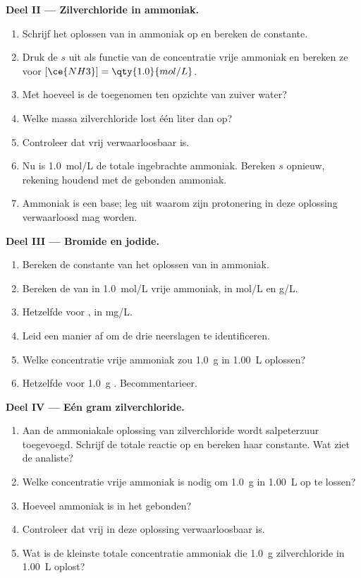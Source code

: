 \begin{problem}
\medskip
\noindent\textbf{Deel II --- Zilverchloride in ammoniak.}
\begin{enumerate}[resume]
  \item Schrijf het oplossen van  in ammoniak op en bereken de
        constante.
  \item Druk de  $s$ uit als functie van de concentratie vrije
        ammoniak en bereken ze voor $[\ce{NH3}] = \qty{1.0}{mol/L}$.
  \item Met hoeveel is de  toegenomen ten opzichte van zuiver
        water?
  \item Welke massa zilverchloride lost één liter dan op?
  \item Controleer dat vrij  verwaarloosbaar is.
  \item Nu is \qty{1.0}{mol/L} de totale ingebrachte ammoniak. Bereken
        $s$ opnieuw, rekening houdend met de gebonden ammoniak.
  \item Ammoniak is een base; leg uit waarom zijn protonering in deze
        oplossing verwaarloosd mag worden.
\end{enumerate}

\medskip
\noindent\textbf{Deel III --- Bromide en jodide.}
\begin{enumerate}[resume]
  \item Bereken de constante van het oplossen van  in ammoniak.
  \item Bereken de  van  in \qty{1.0}{mol/L} vrije
        ammoniak, in \unit{mol/L} en \unit{g/L}.
  \item Hetzelfde voor , in \unit{mg/L}.
  \item Leid een manier af om de drie neerslagen te identificeren.
  \item Welke concentratie vrije ammoniak zou \qty{1.0}{g}  in
        \qty{1.00}{L} oplossen?
  \item Hetzelfde voor \qty{1.0}{g} . Becommentarieer.
\end{enumerate}

\medskip
\noindent\textbf{Deel IV --- Eén gram zilverchloride.}
\begin{enumerate}[resume]
  \item Aan de ammoniakale oplossing van zilverchloride wordt
        salpeterzuur toegevoegd. Schrijf de totale reactie op en bereken
        haar constante. Wat ziet de analiste?
  \item Welke concentratie vrije ammoniak is nodig om \qty{1.0}{g}
         in \qty{1.00}{L} op te lossen?
  \item Hoeveel ammoniak is in het  gebonden?
  \item Controleer dat vrij  in deze oplossing verwaarloosbaar is.
  \item Wat is de kleinste totale concentratie ammoniak die \qty{1.0}{g}
        zilverchloride in \qty{1.00}{L} oplost?
\end{enumerate}
\end{problem}
